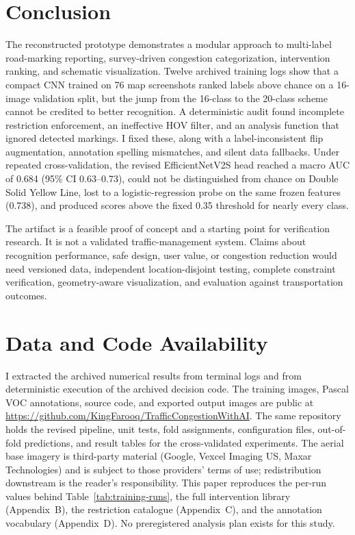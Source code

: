\documentclass[11pt]{article}
\begin{document}
\section{Conclusion}
The reconstructed prototype demonstrates a modular approach to multi-label road-marking reporting, survey-driven congestion categorization, intervention ranking, and schematic visualization. Twelve archived training logs show that a compact CNN trained on 76 map screenshots ranked labels above chance on a 16-image validation split, but the jump from the 16-class to the 20-class scheme cannot be credited to better recognition. A deterministic audit found incomplete restriction enforcement, an ineffective HOV filter, and an analysis function that ignored detected markings. I fixed these, along with a label-inconsistent flip augmentation, annotation spelling mismatches, and silent data fallbacks. Under repeated cross-validation, the revised EfficientNetV2S head reached a macro AUC of 0.684 (95\% CI 0.63--0.73), could not be distinguished from chance on Double Solid Yellow Line, lost to a logistic-regression probe on the same frozen features (0.738), and produced scores above the fixed 0.35 threshold for nearly every class.

The artifact is a feasible proof of concept and a starting point for verification research. It is not a validated traffic-management system. Claims about recognition performance, safe design, user value, or congestion reduction would need versioned data, independent location-disjoint testing, complete constraint verification, geometry-aware visualization, and evaluation against transportation outcomes.

\section*{Data and Code Availability}
\label{sec:data-code}
I extracted the archived numerical results from terminal logs and from deterministic execution of the archived decision code. The training images, Pascal VOC annotations, source code, and exported output images are public at \url{https://github.com/KingFarooq/TrafficCongestionWithAI}. The same repository holds the revised pipeline, unit tests, fold assignments, configuration files, out-of-fold predictions, and result tables for the cross-validated experiments. The aerial base imagery is third-party material (Google, Vexcel Imaging US, Maxar Technologies) and is subject to those providers' terms of use; redistribution downstream is the reader's responsibility. This paper reproduces the per-run values behind Table~\ref{tab:training-runs}, the full intervention library (Appendix~B), the restriction catalogue (Appendix~C), and the annotation vocabulary (Appendix~D). No preregistered analysis plan exists for this study.
\end{document}
